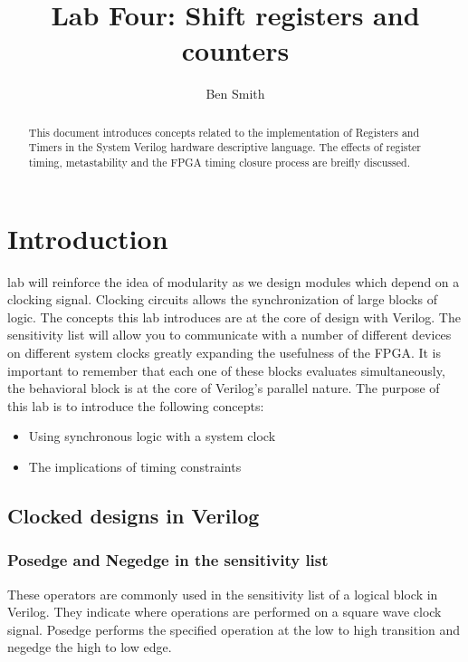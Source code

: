 \title{Lab Four: Shift registers and counters}
\author{Ben Smith}




  \maketitle
    \begin{abstract}
      This document introduces concepts related to the implementation of Registers and Timers in the System Verilog hardware descriptive language. The effects of register timing, metastability and the FPGA timing closure process are breifly discussed.
    \end{abstract}
\section{Introduction}
   lab will reinforce the idea of modularity as we design modules which depend on a clocking signal. Clocking circuits allows the synchronization of large blocks of logic. The concepts this lab introduces are at the core of design with Verilog. The sensitivity list will allow you to communicate with a number of different devices on different system clocks greatly expanding the usefulness of the FPGA. It is important to remember that each one of these blocks evaluates simultaneously, the behavioral block is at the core of Verilog's parallel nature. The purpose of this lab is to introduce the following concepts:
    \begin{itemize}
      \item Using synchronous logic with a system clock
      \item The implications of timing constraints
    \end{itemize}
    

  \subsection{Clocked designs in Verilog}

    \subsubsection{Posedge and Negedge in the sensitivity list}
      These operators are commonly used in the sensitivity list of a logical block in Verilog. They indicate where operations are performed on a square wave clock signal. Posedge performs the specified operation at the low to high transition and negedge the high to low edge.
    
